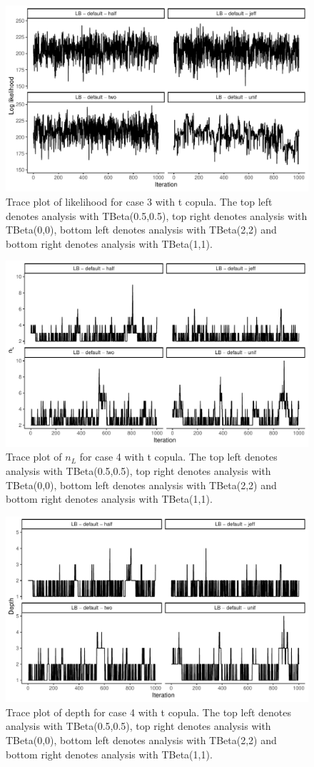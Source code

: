\documentclass{amsart}
\begin{document}
\begin{figure}
	\centering
	\includegraphics[width = 0.75\linewidth]{trace_case3_t_like.pdf}
	\caption{Trace plot of likelihood for case 3 with t copula. The top left denotes analysis with TBeta(0.5,0.5), top right denotes analysis with TBeta(0,0), bottom left denotes analysis with TBeta(2,2) and bottom right denotes analysis with TBeta(1,1).}
	\label{fig:case3:t:like}
\end{figure}

\begin{figure}
	\centering
	\includegraphics[width = 0.75\linewidth]{trace_case4_t_nterm.pdf}
	\caption{Trace plot of $n_L$ for case 4 with t copula. The top left denotes analysis with TBeta(0.5,0.5), top right denotes analysis with TBeta(0,0), bottom left denotes analysis with TBeta(2,2) and bottom right denotes analysis with TBeta(1,1).}
	\label{fig:case4:t:nterm}
\end{figure}

\begin{figure}
	\centering
	\includegraphics[width = 0.75\linewidth]{trace_case4_t_depth.pdf}
	\caption{Trace plot of depth for case 4 with t copula. The top left denotes analysis with TBeta(0.5,0.5), top right denotes analysis with TBeta(0,0), bottom left denotes analysis with TBeta(2,2) and bottom right denotes analysis with TBeta(1,1).}
	\label{fig:case4:t:depth}
\end{figure}
\end{document}
